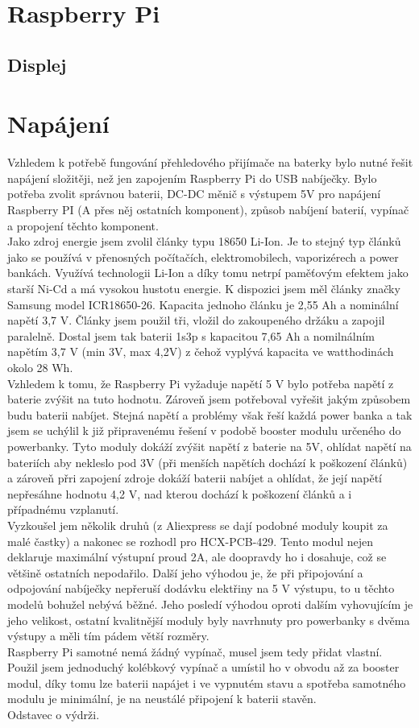 \documentclass{ctuthesis}
\begin{document}
\section{Raspberry Pi}
\subsection{Displej}

\section{Napájení}
Vzhledem k potřebě fungování přehledového přijímače na baterky bylo nutné řešit napájení složitěji, než jen zapojením Raspberry Pi do USB nabíječky. Bylo potřeba zvolit správnou baterii, DC-DC měnič s výstupem 5V pro napájení Raspberry PI (A přes něj ostatních komponent), způsob nabíjení baterií, vypínač a propojení těchto komponent.\\
 Jako zdroj energie jsem zvolil články typu 18650 Li-Ion. Je to stejný typ článků jako se používá v přenosných počítačích, elektromobilech, vaporizérech a power bankách. Využívá technologii Li-Ion a díky tomu netrpí paměťovým efektem jako starší Ni-Cd a má vysokou hustotu energie. K dispozici jsem měl články značky Samsung model ICR18650-26. Kapacita jednoho článku je 2,55 Ah a nominální napětí 3,7 V. Články jsem použil tři, vložil do zakoupeného držáku a zapojil paralelně. Dostal jsem tak baterii 1s3p s kapacitou 7,65 Ah a nomilnálním napětím 3,7 V (min 3V, max 4,2V) z čehož vyplývá kapacita ve watthodinách okolo 28 Wh.\\
 Vzhledem k tomu, že Raspberry Pi vyžaduje napětí 5 V bylo potřeba napětí z baterie zvýšit na tuto hodnotu. Zároveň jsem potřeboval vyřešit jakým způsobem budu baterii nabíjet. Stejná napětí a problémy však řeší každá power banka a tak jsem se uchýlil k již připravenému řešení v podobě booster modulu určeného do powerbanky. Tyto moduly dokáží zvýšit napětí z baterie na 5V, ohlídat napětí na bateriích aby nekleslo pod 3V (při menších napětích dochází k poškození článků) a zároveň přri zapojení zdroje dokáží baterii nabíjet a ohlídat, že její napětí nepřesáhne hodnotu 4,2 V, nad kterou dochází k poškození článků a i případnému vzplanutí.\\
 Vyzkoušel jem několik druhů (z Aliexpress se dají podobné moduly koupit za malé častky) a nakonec se rozhodl pro HCX-PCB-429. Tento modul nejen deklaruje maximální výstupní proud 2A, ale doopravdy ho i dosahuje, což se většině ostatních nepodařilo. Další jeho výhodou je, že při připojování a odpojování nabíječky nepřeruší dodávku elektřiny na 5 V výstupu, to u těchto modelů bohužel nebývá běžné. Jeho posledí výhodou oproti dalším vyhovujícím je jeho velikost, ostatní kvalitnější moduly byly navrhnuty pro powerbanky s dvěma výstupy a měli tím pádem větší rozměry. \\
 Raspberry Pi samotné nemá žádný vypínač, musel jsem tedy přidat vlastní. Použil jsem jednoduchý kolébkový vypínač a umístil ho v obvodu až za booster modul, díky tomu lze baterii napájet i ve vypnutém stavu a spotřeba samotného modulu je minimální, je na neustálé připojení k baterii stavěn.\\
 Odstavec o výdrži.\\
 
\end{document}
